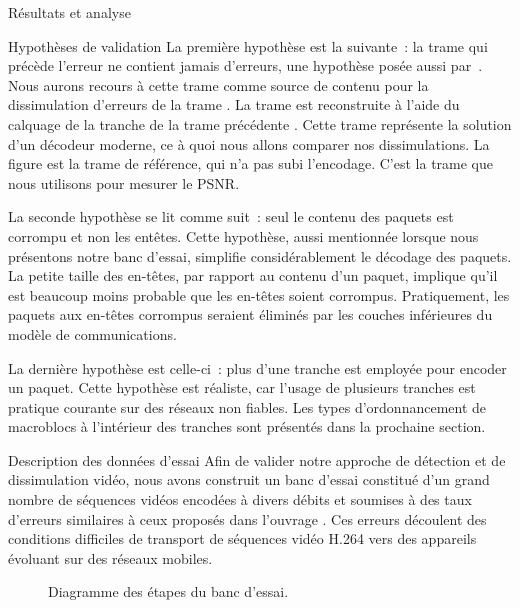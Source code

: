 \begin{chapter}{Résultats et analyse}
\begin{section}{Hypothèses de validation}
La première hypothèse est la suivante~: la trame qui précède l'erreur
 ne contient jamais d'erreurs, une hypothèse posée aussi
par~\citep{Superiori2007}. Nous aurons recours à cette trame comme source de
contenu pour la dissimulation d'erreurs de la trame . La
trame  est reconstruite à l'aide du calquage de la tranche de
la trame précédente . Cette trame représente la solution
d'un décodeur moderne, ce à quoi nous allons comparer nos dissimulations. La
figure  est la trame de référence, qui n'a pas subi
l'encodage. C'est la trame que nous utilisons pour mesurer le PSNR.

La seconde hypothèse se lit comme suit~: seul le contenu des paquets est
corrompu et non les entêtes. Cette hypothèse, aussi mentionnée lorsque nous
présentons notre banc d'essai, simplifie considérablement le décodage des
paquets. La petite taille des en-têtes, par rapport au contenu d'un paquet,
implique qu'il est beaucoup moins probable que les en-têtes soient corrompus.
Pratiquement, les paquets aux en-têtes corrompus seraient éliminés par les
couches inférieures du modèle de communications.

La dernière hypothèse est celle-ci~: plus d'une tranche est employée pour
encoder un paquet. Cette hypothèse est réaliste, car l'usage de plusieurs
tranches est pratique courante sur des réseaux non fiables. Les types
d'ordonnancement de macroblocs à l'intérieur des tranches sont présentés dans la
prochaine section.

\end{section}

\begin{section}{Description des données d'essai}
\label{sec-bancEssai}
Afin de valider notre approche de détection et de dissimulation vidéo,
nous avons construit un banc d'essai constitué d'un grand nombre de séquences
vidéos encodées à divers débits et soumises à des taux d'erreurs similaires à
ceux proposés dans l'ouvrage \citep{Stockhammer2003}. Ces erreurs découlent des
conditions difficiles de transport de séquences vidéo H.264 vers des appareils
évoluant sur des réseaux mobiles.

\begin{figure}[htb] 
\caption[Diagramme des étapes du banc d'essai]{Diagramme des étapes du banc
d'essai.}
\label{fig-EncoderDecoder}
\end{figure}


\end{section}
\end{chapter}
